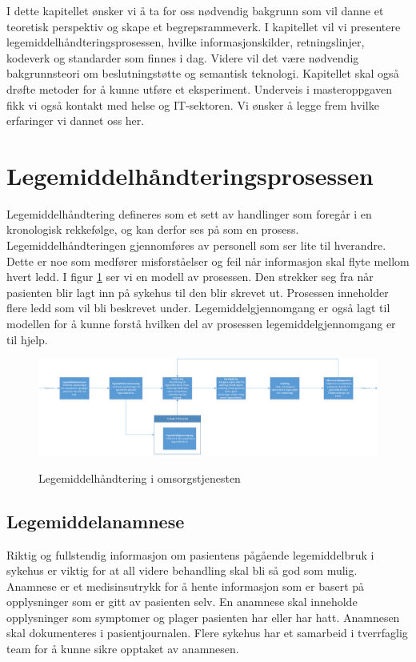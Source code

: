 I dette kapitellet ønsker vi å ta for oss nødvendig bakgrunn som vil danne et teoretisk perspektiv og skape et begrepsrammeverk. I kapitellet vil vi presentere legemiddelhåndteringsprosessen, hvilke informasjonskilder, retningslinjer, kodeverk og standarder som finnes i dag. Videre vil det være nødvendig bakgrunnsteori om beslutningstøtte og semantisk teknologi. Kapitellet skal også drøfte metoder for å kunne utføre et eksperiment. Underveis i masteroppgaven fikk vi også kontakt med helse og IT-sektoren. Vi ønsker å legge frem hvilke erfaringer vi dannet oss her.


\section{Legemiddelhåndteringsprosessen}
Legemiddelhåndtering defineres som et sett av handlinger som foregår i en kronologisk rekkefølge, og kan derfor ses på som en prosess. Legemiddelhåndteringen gjennomføres av personell som ser lite til hverandre. Dette er noe som medfører misforståelser og feil når informasjon skal flyte mellom hvert ledd. I figur \ref{fig:legemiddelhanderingsprosessen} ser vi en modell av prosessen. Den strekker seg fra når pasienten blir lagt inn på sykehus til den blir skrevet ut. Prosessen inneholder flere ledd som vil bli beskrevet under. Legemiddelgjennomgang er også lagt til modellen for å kunne forstå hvilken del av prosessen legemiddelgjennomgang er til hjelp.
 
\begin{figure}[H]
\centering
\includegraphics[width=18cm]{images/Legemiddelhandtering}
\label{fig:legemiddelhanderingsprosessen}
\caption{Legemiddelhåndtering i omsorgstjenesten}
\end{figure}
 
\subsection{Legemiddelanamnese} 
Riktig og fullstendig informasjon om pasientens pågående legemiddelbruk i sykehus er viktig for at all videre behandling skal bli så god som mulig. Anamnese er et medisinsutrykk for å hente informasjon som er basert på opplysninger som er gitt av pasienten selv. En anamnese skal inneholde opplysninger som symptomer og plager pasienten har eller har hatt. Anamnesen skal dokumenteres i pasientjournalen. Flere sykehus har et samarbeid i tverrfaglig team for å kunne sikre opptaket av anamnesen.

